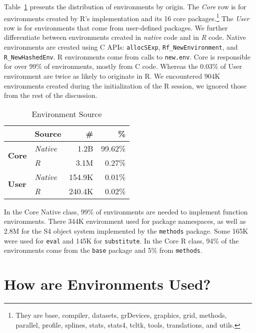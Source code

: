 \documentclass[10pt,sigplan,authorversion=true]{acmart}
\renewcommand{\c}[1]{\lstinline |#1|\xspace}
\newcommand{\newEnv}{\c{new.env}}
\begin{document}
Table~\ref{table:env_source} presents the distribution of environments by
origin. The \emph{Core} row is for environments created by R's implementation
and its 16 core packages.\footnote{They are base, compiler, {datasets},
{grDevices}, {graphics}, {grid}, {methods}, {parallel}, {profile}, {splines},
{stats}, {stats4}, {tcltk}, {tools}, {translations}, and {utils.}} The
\emph{User} row is for environments that come from user-defined packages. We
further differentiate between environments created in \emph{native} code and in
\emph{R} code. Native environments are created using C APIs: \c{allocSExp},
\c{Rf_NewEnvironment}, and \c{R_NewHashedEnv}. R environments come from calls
to \newEnv. Core is responsible for over 99\% of environments, mostly from C
code. Whereas the 0.03\% of User environment are twice as likely to originate in
R. We encountered 904K environments created during the initialization of the R
session, we ignored those from the rest of the discussion.

\begin{table}[!h]\small\centering
  \caption{Environment Source}\label{table:env_source}
  \begin{tabular}{llrr}\toprule
  &\textbf{Source}&\textbf{\#}&\textbf{\%}\\\midrule
\multirow{2}{*}{\textbf{Core}}&\multicolumn{1}{l}{\emph{Native}}&\multicolumn{1}{r}{1.2B}&\multicolumn{1}{r}{99.62\%}\\
                               & \multicolumn{1}{l}{\emph{R}}     & \multicolumn{1}{r}{3.1M} & \multicolumn{1}{r}{0.27\%}\\\midrule
\multirow{2}{*}{\textbf{User}}  & \multicolumn{1}{l}{\emph{Native}} & \multicolumn{1}{r}{154.9K} & \multicolumn{1}{r}{0.01\%}\\
                                & \multicolumn{1}{l}{\emph{R}}      & \multicolumn{1}{r}{240.4K} & \multicolumn{1}{r}{0.02\%}\\\bottomrule
  \end{tabular}
\end{table}

\noindent
In the Core Native class, 99\% of environments are needed to implement function
environments. There 344K environment used for package namespaces, as well as
2.8M for the S4 object system implemented by the \c{methods} package. Some 165K
were used for \c{eval} and 145K for \c{substitute}. In the Core R class, 94\% of
the environments come from the \c{base} package and 5\% from \c{methods}.


\section{How are Environments Used?}
\end{document}
